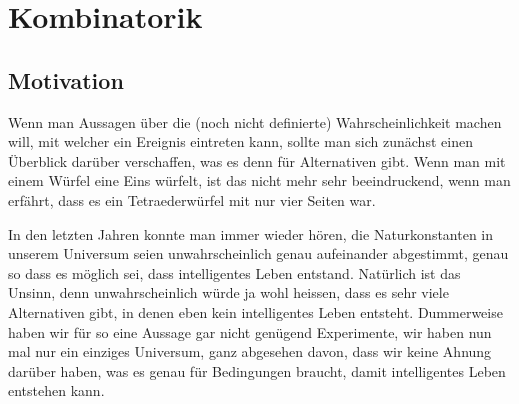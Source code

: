 %
%
%
\chapter{Kombinatorik}
\label{chapter:kombinatorik}
\section{Motivation}
Wenn man Aussagen über die (noch nicht definierte) Wahrscheinlichkeit
machen will, mit welcher ein Ereignis eintreten kann, sollte man sich
zunächst einen Überblick darüber verschaffen, was es denn für
Alternativen gibt.
Wenn man mit einem Würfel eine Eins würfelt, ist
das nicht mehr sehr beeindruckend, wenn man erfährt, dass es ein
Tetraederwürfel mit nur vier Seiten war. 

In den letzten Jahren konnte man immer wieder hören, die Naturkonstanten
in unserem Universum seien unwahrscheinlich genau aufeinander abgestimmt,
genau so dass es möglich sei, dass intelligentes Leben entstand.
Natürlich ist das Unsinn, denn unwahrscheinlich würde ja wohl
heissen, dass es sehr viele Alternativen gibt, in denen eben kein
intelligentes Leben entsteht.
Dummerweise haben wir für so eine Aussage
gar nicht genügend Experimente, wir haben nun mal nur ein einziges
Universum, ganz abgesehen davon, dass wir keine Ahnung darüber haben,
was es genau für Bedingungen braucht, damit intelligentes Leben
entstehen kann.










